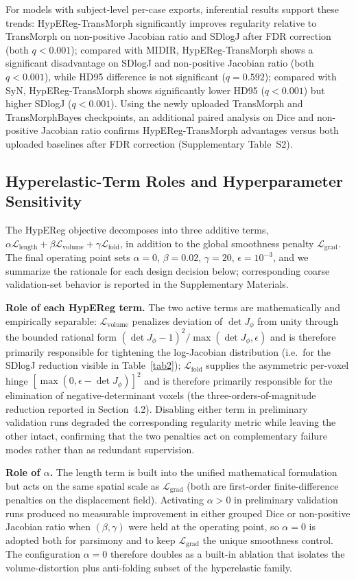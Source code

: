 \documentclass[jimaging,article,submit,pdftex,moreauthors]{Definitions/mdpi}
\begin{document}
For models with subject-level per-case exports, inferential results support these trends: HypEReg-TransMorph significantly improves regularity relative to TransMorph on non-positive Jacobian ratio and SDlogJ after FDR correction (both \(q<0.001\)); compared with MIDIR, HypEReg-TransMorph shows a significant disadvantage on SDlogJ and non-positive Jacobian ratio (both \(q<0.001\)), while HD95 difference is not significant (\(q=0.592\)); compared with SyN, HypEReg-TransMorph shows significantly lower HD95 (\(q<0.001\)) but higher SDlogJ (\(q<0.001\)). Using the newly uploaded TransMorph and TransMorphBayes checkpoints, an additional paired analysis on Dice and non-positive Jacobian ratio confirms HypEReg-TransMorph advantages versus both uploaded baselines after FDR correction (Supplementary Table~S2).

\subsection{Hyperelastic-Term Roles and Hyperparameter Sensitivity}\label{sec:ablation}
The HypEReg objective decomposes into three additive terms, $\alpha\mathcal{L}_{\mathrm{length}}+\beta\mathcal{L}_{\mathrm{volume}}+\gamma\mathcal{L}_{\mathrm{fold}}$, in addition to the global smoothness penalty $\mathcal{L}_{\mathrm{grad}}$. The final operating point sets $\alpha=0$, $\beta=0.02$, $\gamma=20$, $\epsilon=10^{-3}$, and we summarize the rationale for each design decision below; corresponding coarse validation-set behavior is reported in the Supplementary Materials.

\noindent\textbf{Role of each HypEReg term.} The two active terms are mathematically and empirically separable: $\mathcal{L}_{\mathrm{volume}}$ penalizes deviation of $\det J_\phi$ from unity through the bounded rational form $(\det J_\phi-1)^2/\max(\det J_\phi,\epsilon)$ and is therefore primarily responsible for tightening the log-Jacobian distribution (i.e.\ for the SDlogJ reduction visible in Table~\ref{tab2}); $\mathcal{L}_{\mathrm{fold}}$ supplies the asymmetric per-voxel hinge $[\max(0,\epsilon-\det J_\phi)]^2$ and is therefore primarily responsible for the elimination of negative-determinant voxels (the three-orders-of-magnitude reduction reported in Section~4.2). Disabling either term in preliminary validation runs degraded the corresponding regularity metric while leaving the other intact, confirming that the two penalties act on complementary failure modes rather than as redundant supervision.

\noindent\textbf{Role of $\alpha$.} The length term is built into the unified mathematical formulation but acts on the same spatial scale as $\mathcal{L}_{\mathrm{grad}}$ (both are first-order finite-difference penalties on the displacement field). Activating $\alpha>0$ in preliminary validation runs produced no measurable improvement in either grouped Dice or non-positive Jacobian ratio when $(\beta,\gamma)$ were held at the operating point, so $\alpha=0$ is adopted both for parsimony and to keep $\mathcal{L}_{\mathrm{grad}}$ the unique smoothness control. The configuration $\alpha=0$ therefore doubles as a built-in ablation that isolates the volume-distortion plus anti-folding subset of the hyperelastic family.
\end{document}

